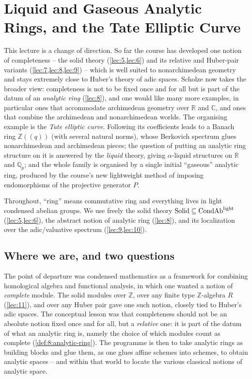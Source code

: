 \section{Liquid and Gaseous Analytic Rings, and the Tate Elliptic Curve}
\label{lec:12}

This lecture is a change of direction. So far the course has developed one
notion of completeness -- the solid theory (\cref{lec:5,lec:6}) and its
relative and Huber-pair variants (\cref{lec:7,lec:8,lec:9}) -- which is
well suited to nonarchimedean geometry and stays extremely close to Huber's
theory of adic spaces. Scholze now takes the broader view: completeness is not
to be fixed once and for all but is part of the datum of an \emph{analytic ring}
(\cref{lec:8}), and one would like many more examples, in particular ones that
accommodate archimedean geometry over $\mathbb{R}$ and $\mathbb{C}$, and ones
that combine the archimedean and nonarchimedean worlds. The organising example
is the \emph{Tate elliptic curve}. Following its coefficients leads to a Banach
ring $\mathbb{Z}(\!(q)\!)$ (with several natural norms), whose Berkovich
spectrum glues nonarchimedean and archimedean pieces; the question of putting an
analytic ring structure on it is answered by the \emph{liquid} theory, giving
$\alpha$-liquid structures on $\mathbb{R}$ and $\mathbb{Q}_p$; and the whole
family is organised by a single initial ``gaseous'' analytic ring, produced by
the course's new lightweight method of imposing endomorphisms of the projective
generator $P$.

Throughout, ``ring'' means commutative ring and everything lives in light
condensed abelian groups. We use freely the solid theory
$\mathrm{Solid}\subseteq\mathrm{CondAb}^{\mathrm{light}}$ (\cref{lec:5,lec:6}), the abstract notion of analytic
ring (\cref{lec:8}), and its localization over the adic/valuative spectrum
(\cref{lec:9,lec:10}).

\subsection{Where we are, and two questions}

\begin{remark}
\label{rmk:12:relative-completeness}
The point of departure was condensed mathematics as a framework for combining
homological algebra and functional analysis, in which one wanted a notion of
\emph{complete} module. The solid modules over $\mathbb{Z}$, over any finite type
$\mathbb{Z}$-algebra $R$ (\cref{lec:11}), and over any Huber pair gave one such
notion, closely tied to Huber's adic spaces. The conceptual lesson was that
completeness should not be an absolute notion fixed once and for all, but a
\emph{relative} one: it is part of the datum of what an analytic ring is,
namely the choice of which modules count as complete (\cref{def:8:analytic-ring}).
The programme is then to take analytic rings as building blocks and glue them,
as one glues affine schemes into schemes, to obtain analytic spaces -- and
within that world to locate the various classical notions of analytic space.
\end{remark}

